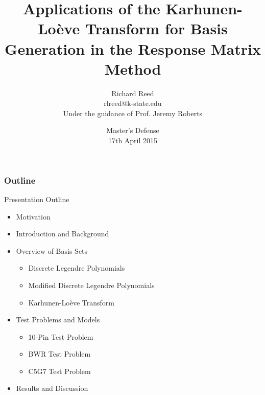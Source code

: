 \documentclass[fleqn]{beamer}
\title[KLT Basis for Energy Expansion]{
  Applications of the Karhunen-Lo\`{e}ve Transform for Basis Generation in the 
Response Matrix Method}
\author[Richard Reed]{
  Richard Reed \\
  rlreed@k-state.edu \\
  Under the guidance of Prof. Jeremy Roberts}
\institute[Kansas State University]{
  Mechanical and Nuclear Engineering \\
  Kansas State University}
\date[Master's Defense]{
  Master's Defense \\
  17th April 2015}
\begin{document}
  \newcommand{\beginbackup}{
    \newcounter{framenumbervorappendix}
    \setcounter{framenumbervorappendix}{\value{framenumber}}
  }
  \newcommand{\backupend}{
    \addtocounter{framenumbervorappendix}{-\value{framenumber}}
    \addtocounter{framenumber}{\value{framenumbervorappendix}} 
  }
  
  
  \begin{frame}
    \titlepage
  \end{frame}
  
  \begin{frame}
    \frametitle{Outline}
    \begin{block}{Presentation Outline}
      \begin{itemize}
          \item Motivation
          \item Introduction and Background
    \item Overview of Basis Sets
    \begin{itemize}
        \item Discrete Legendre Polynomials
        \item Modified Discrete Legendre Polynomials
        \item Karhunen-Lo\`{e}ve Transform
    \end{itemize}

	\item Test Problems and Models
	\begin{itemize}
	  \item 10-Pin Test Problem
	  \item BWR Test Problem
      \item C5G7 Test Problem
	\end{itemize}
	\item Results and Discussion
      \end{itemize}
    \end{block}
  \end{frame}
  
\end{document}
